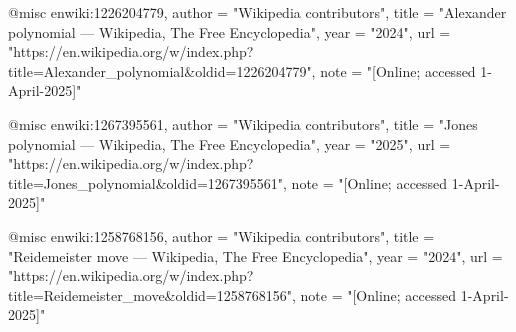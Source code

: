   @misc{ enwiki:1226204779,
    author = "{Wikipedia contributors}",
    title = "Alexander polynomial --- {Wikipedia}{,} The Free Encyclopedia",
    year = "2024",
    url = "https://en.wikipedia.org/w/index.php?title=Alexander_polynomial&oldid=1226204779",
    note = "[Online; accessed 1-April-2025]"
  }

  @misc{ enwiki:1267395561,
    author = "{Wikipedia contributors}",
    title = "Jones polynomial --- {Wikipedia}{,} The Free Encyclopedia",
    year = "2025",
    url = "https://en.wikipedia.org/w/index.php?title=Jones_polynomial&oldid=1267395561",
    note = "[Online; accessed 1-April-2025]"
  }

    @misc{ enwiki:1258768156,
    author = "{Wikipedia contributors}",
    title = "Reidemeister move --- {Wikipedia}{,} The Free Encyclopedia",
    year = "2024",
    url = "https://en.wikipedia.org/w/index.php?title=Reidemeister_move&oldid=1258768156",
    note = "[Online; accessed 1-April-2025]"
  }